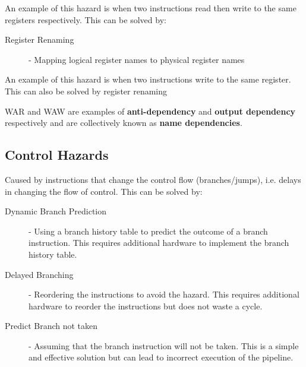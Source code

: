 \documentclass[12pt letter]{report}
\begin{document}
An example of this hazard is when two instructions read then write to the same registers respectively. This can be solved by:
\begin{description}
  \item[Register Renaming] - Mapping logical register names to physical register names
\end{description}


An example of this hazard is when two instructions write to the same register. This can also be solved by register renaming

WAR and WAW are examples of \textbf{anti-dependency} and \textbf{output dependency} respectively and are collectively known as \textbf{name dependencies}.

\subsection{Control Hazards}
Caused by instructions that change the control flow (branches/jumps), i.e. delays in changing the flow of control. This can be solved by:
\begin{description}
  \item[Dynamic Branch Prediction]  - Using a branch history table to predict the outcome of a branch instruction. This requires additional hardware to implement the branch history table.
  \item[Delayed Branching] - Reordering the instructions to avoid the hazard. This requires additional hardware to reorder the instructions but does not waste a cycle.
  \item[Predict Branch not taken] - Assuming that the branch instruction will not be taken. This is a simple and effective solution but can lead to incorrect execution of the pipeline.
\end{description}
\end{document}

